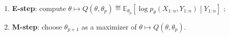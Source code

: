 \begin{enumerate}%
	\item {\bf E-step}: compute $\theta \mapsto Q(\theta,\theta_{p})\eqdef \mathbb{E}_{\theta_p}\left[\log p_{\theta}(X_{1:n},Y_{1:n})\middle|Y_{1:n}\right]$ ;
	\item {\bf M-step}: choose $\theta_{p+1}$ as a maximizer of $\theta \mapsto Q(\theta,\theta_{p})$.
\end{enumerate}
